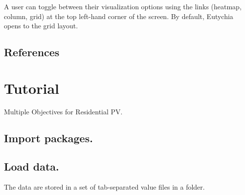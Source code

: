 \documentclass[letterpaper,10pt,english]{sphinxmanual}
\begin{document}
A user can toggle between their visualization options using the links
(heatmap, column, grid) at the top left-hand corner of the screen. By
default, Eutychia opens to the grid layout.


\section{References}
\label{\detokenize{user-interface:references}}

\chapter{Tutorial}
\label{\detokenize{tutorial:tutorial}}\label{\detokenize{tutorial::doc}}
Multiple Objectives for Residential PV.


\section{Import packages.}
\label{\detokenize{tutorial:import-packages}}
\begin{sphinxVerbatim}[commandchars=\\\{\}]
 
 
 
\end{sphinxVerbatim}

\begin{sphinxVerbatim}[commandchars=\\\{\}]
               
   
              
             
               

              
   
\end{sphinxVerbatim}


\section{Load data.}
\label{\detokenize{tutorial:load-data}}
The data are stored in a set of tab-separated value files in a folder.
\end{document}
